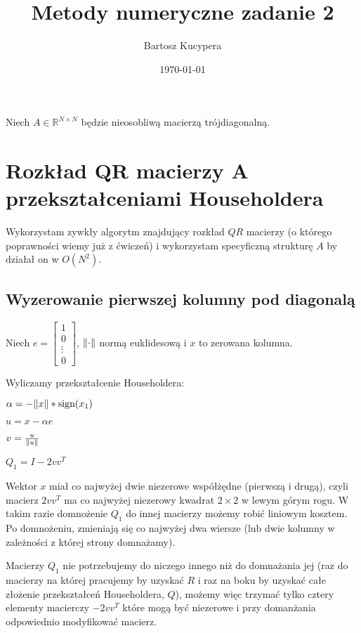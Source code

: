 \documentclass{article}
\title{Metody numeryczne zadanie 2}
\author{Bartosz Kucypera}
\date{\today}
\newcommand{\sign}{\text{sign}}
\begin{document}
\maketitle

Niech $A \in \mathbb{R}^{N \times N}$ będzie nieosobliwą macierzą trójdiagonalną.

\section*{Rozkład QR macierzy A przekształceniami Householdera}
Wykorzystam zywkły algorytm znajdujący rozkład $QR$ macierzy (o którego poprawności wiemy już z ćwiczeń) i wykorzystam specyficzną strukturę $A$ by działał on w $O(N^2)$.

\subsection*{Wyzerowanie pierwszej kolumny pod diagonalą}
Niech $e =  \begin{bmatrix} 1 \\ 0 \\ \vdots \\ 0 \end{bmatrix}$, $\norm{\cdot}$ normą euklidesową i $x$ to zerowana kolumna.

Wyliczamy przekształcenie Householdera: 

$ \alpha = -\norm{x}* \sign(x_1)$

$ u = x - \alpha e$

$ v = \frac{u}{\norm{u}} $

$Q_1 = I - 2vv^T$

Wektor $x$ miał co najwyżej dwie niezerowe współżędne (pierwszą i drugą), czyli macierz $2vv^T$ ma co najwyżej niezerowy kwadrat $2\times2$ w lewym górym rogu. \newline
W takim razie domnożenie $Q_1$ do innej macierzy możemy robić liniowym kosztem. \newline
Po domnożeniu, zmieniają się co najwyżej dwa wiersze (lub dwie kolumny w zależności z której strony domnażamy).

Macierzy $Q_1$ nie potrzebujemy do niczego innego niż do domnażania jej (raz do macierzy na której pracujemy by uzyskać $R$ i raz na boku by uzyskać całe złożenie przekształceń Householdera, $Q$), możemy więc trzymać tylko cztery elementy macierczy $-2vv^T$ które mogą być niezerowe i przy domanżania odpowiednio modyfikować macierz.

\newpage
\end{document}
